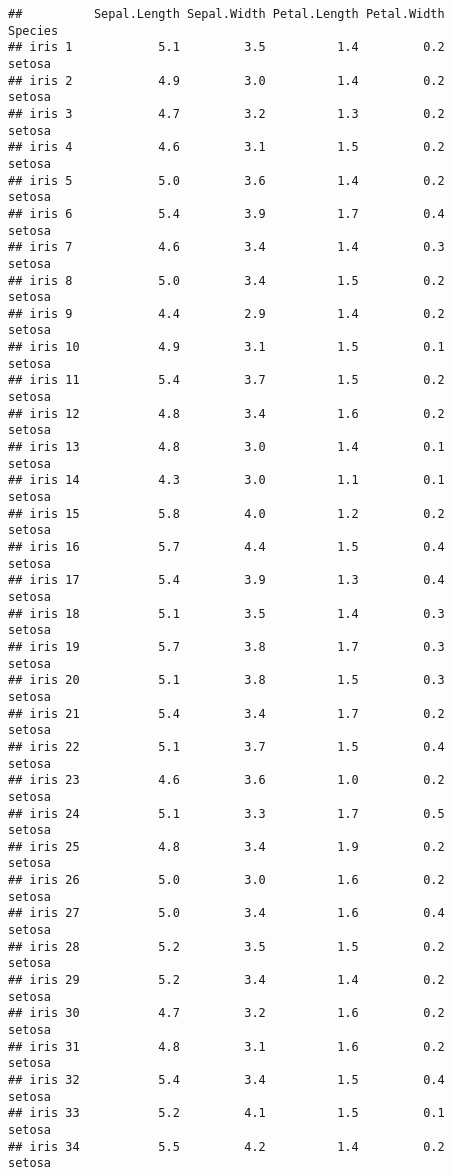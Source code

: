 \documentclass[
]{article}
\begin{document}
\begin{verbatim}
##          Sepal.Length Sepal.Width Petal.Length Petal.Width    Species
## iris 1            5.1         3.5          1.4         0.2     setosa
## iris 2            4.9         3.0          1.4         0.2     setosa
## iris 3            4.7         3.2          1.3         0.2     setosa
## iris 4            4.6         3.1          1.5         0.2     setosa
## iris 5            5.0         3.6          1.4         0.2     setosa
## iris 6            5.4         3.9          1.7         0.4     setosa
## iris 7            4.6         3.4          1.4         0.3     setosa
## iris 8            5.0         3.4          1.5         0.2     setosa
## iris 9            4.4         2.9          1.4         0.2     setosa
## iris 10           4.9         3.1          1.5         0.1     setosa
## iris 11           5.4         3.7          1.5         0.2     setosa
## iris 12           4.8         3.4          1.6         0.2     setosa
## iris 13           4.8         3.0          1.4         0.1     setosa
## iris 14           4.3         3.0          1.1         0.1     setosa
## iris 15           5.8         4.0          1.2         0.2     setosa
## iris 16           5.7         4.4          1.5         0.4     setosa
## iris 17           5.4         3.9          1.3         0.4     setosa
## iris 18           5.1         3.5          1.4         0.3     setosa
## iris 19           5.7         3.8          1.7         0.3     setosa
## iris 20           5.1         3.8          1.5         0.3     setosa
## iris 21           5.4         3.4          1.7         0.2     setosa
## iris 22           5.1         3.7          1.5         0.4     setosa
## iris 23           4.6         3.6          1.0         0.2     setosa
## iris 24           5.1         3.3          1.7         0.5     setosa
## iris 25           4.8         3.4          1.9         0.2     setosa
## iris 26           5.0         3.0          1.6         0.2     setosa
## iris 27           5.0         3.4          1.6         0.4     setosa
## iris 28           5.2         3.5          1.5         0.2     setosa
## iris 29           5.2         3.4          1.4         0.2     setosa
## iris 30           4.7         3.2          1.6         0.2     setosa
## iris 31           4.8         3.1          1.6         0.2     setosa
## iris 32           5.4         3.4          1.5         0.4     setosa
## iris 33           5.2         4.1          1.5         0.1     setosa
## iris 34           5.5         4.2          1.4         0.2     setosa

\end{verbatim}
\end{document}
